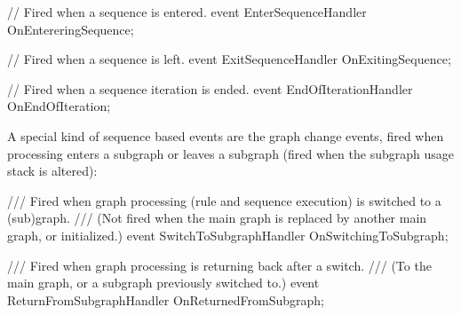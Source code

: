 \begin{csharplet}
// Fired when a sequence is entered.
event EnterSequenceHandler OnEntereringSequence;

// Fired when a sequence is left.
event ExitSequenceHandler OnExitingSequence;

// Fired when a sequence iteration is ended.
event EndOfIterationHandler OnEndOfIteration;
\end{csharplet}

A special kind of sequence based events are the graph change events, fired when processing enters a subgraph or leaves a subgraph (fired when the subgraph usage stack is altered):

\begin{csharplet}
/// Fired when graph processing (rule and sequence execution) is switched to a (sub)graph.
/// (Not fired when the main graph is replaced by another main graph, or initialized.)
event SwitchToSubgraphHandler OnSwitchingToSubgraph;

/// Fired when graph processing is returning back after a switch.
/// (To the main graph, or a subgraph previously switched to.)
event ReturnFromSubgraphHandler OnReturnedFromSubgraph;
\end{csharplet}
